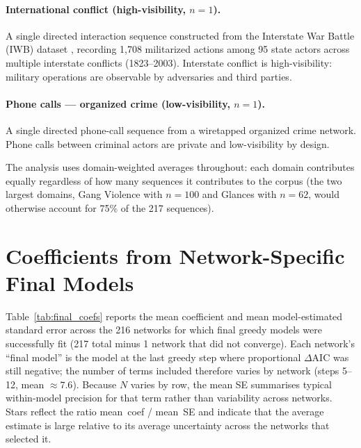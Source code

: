 \documentclass[11pt]{article}
\begin{document}
\paragraph{International conflict (high-visibility, $n = 1$).}
A single directed interaction sequence constructed from the Interstate War Battle (IWB) dataset \citep{miniwd}, recording 1,708 militarized actions among 95 state actors across multiple interstate conflicts (1823--2003). Interstate conflict is high-visibility: military operations are observable by adversaries and third parties.

\paragraph{Phone calls --- organized crime (low-visibility, $n = 1$).}
A single directed phone-call sequence from a wiretapped organized crime network. Phone calls between criminal actors are private and low-visibility by design.

\medskip
\noindent The analysis uses domain-weighted averages throughout: each domain contributes equally regardless of how many sequences it contributes to the corpus (the two largest domains, Gang Violence with $n=100$ and Glances with $n=62$, would otherwise account for 75\% of the 217 sequences).

\section{Coefficients from Network-Specific Final Models}

Table~\ref{tab:final_coefs} reports the mean coefficient and mean
model-estimated standard error across the 216 networks for which
final greedy models were successfully fit (217 total minus 1
network that did not converge).
Each network's ``final model'' is the model at the last greedy step
where proportional $\Delta\text{AIC}$ was still negative; the number of
terms included therefore varies by network (steps 5--12, mean $\approx 7.6$).
Because $N$ varies by row, the mean SE summarises typical within-model
precision for that term rather than variability across networks.
Stars reflect the ratio mean~coef / mean~SE and indicate that the average
estimate is large relative to its average uncertainty across the networks
that selected it.


\end{document}
